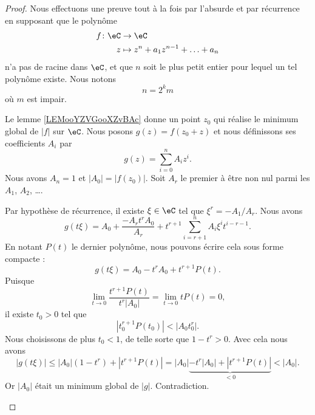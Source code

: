 \begin{proof}
	Nous effectuons une preuve tout à la fois par l'absurde et par récurrence en supposant que le polynôme
	\begin{equation}
		\begin{aligned}
			f\colon \eC & \to \eC                           \\
			z           & \mapsto z^n+a_1z^{n-1}+\ldots+a_n
		\end{aligned}
	\end{equation}
	n'a pas de racine dans \( \eC\), et que \( n\) soit le plus petit entier pour lequel un tel polynôme existe. Nous notons
	\begin{equation}
		n=2^k m
	\end{equation}
	où \( m\) est impair.

	Le lemme \ref{LEMooYZVGooXZvBAc} donne un point \( z_0\) qui réalise le minimum global de \( | f |\) sur \( \eC\). Nous posons \( g(z)=f(z_0+z)\) et nous définissons ses coefficients \( A_i\) par
	\begin{equation}
		g(z)=\sum_{i=0}^n A_iz^i.
	\end{equation}
	Nous avons \( A_n=1\) et \( | A_0 |=| f(z_0) |\). Soit \( A_r\) le premier à être non nul parmi les \( A_1\), \( A_2\), \ldots.
	\begin{subproof}
		\spitem[Si \( r<n\)]
		Par hypothèse de récurrence, il existe \( \xi\in \eC\) tel que \( \xi^r=-A_1/A_r\). Nous avons
		\begin{equation}
			g(t\xi)=A_0+\frac{ -A_rt^rA_0 }{ A_r }+t^{r+1}\sum_{i=r+1}^nA_i\xi^it^{i-r-1}.
		\end{equation}
		En notant \( P(t)\) le dernier polynôme, nous pouvons écrire cela sous forme compacte :
		\begin{equation}
			g(t\xi)=A_0-t^rA_0+t^{r+1}P(t).
		\end{equation}
		Puisque
		\begin{equation}
			\lim_{t\to 0} \frac{ t^{r+1}P(t) }{ t^r| A_0 | }=\lim_{t\to 0} tP(t)=0,
		\end{equation}
		il existe \( t_0>0\) tel que
		\begin{equation}
			| t_0^{r+1}P(t_0) |<| A_0t_0^r |.
		\end{equation}
		Nous choisissons de plus \( t_0<1\), de telle sorte que \( 1-t^r>0\). Avec cela nous avons
		\begin{equation}
			| g(t\xi) |\leq | A_0 |(1-t^r)+| t^{r+1}P(t) |=| A_0 |\underbrace{-t^r| A_0 |+| t^{r+1}P(t) |}_{<0}<| A_0 |.
		\end{equation}
		Or \( | A_0 |\) était un minimum global de \( | g |\). Contradiction.


\end{subproof}
\end{proof}
